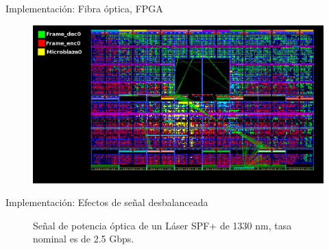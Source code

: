 \documentclass[aspectratio=169]{beamer}
\begin{document}
\begin{frame}{Implementación: Fibra óptica, FPGA}

 \begin{figure}[t]
  \centering
    \includegraphics[width=5.5in]{graphs/fpgamap.jpg}
\label{fig:fpgahard}
\end{figure}


\end{frame}



\begin{frame}{Implementación: Efectos de señal desbalanceada}


\begin{figure}[!t]
   \centering
   \qquad
   \qquad
   
  \vspace{0.2cm}
  Señal de potencia óptica de un Láser SPF+ de 1330 nm, tasa nominal es de 2.5 Gbps.
  \label{fig:ImgExpansion}
\end{figure}
\end{frame}
\end{document}

